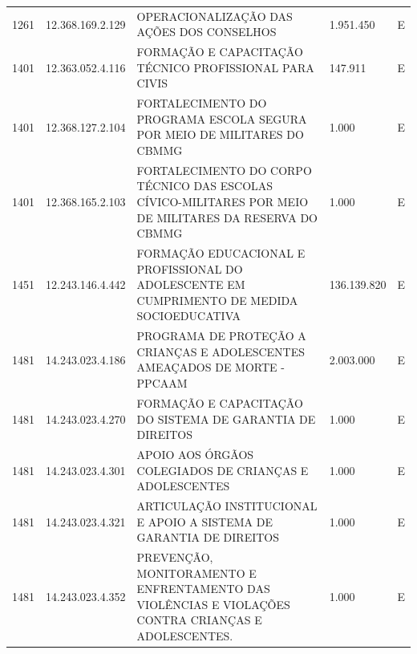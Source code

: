 \documentclass{article}
\begin{document}
\begin{longtable}[c]{m{1cm}|m{2cm}|m{10cm}|m{2cm}|m{1cm}}
\multicolumn{1}{C{1cm}|}{1261} & \multicolumn{1}{C{2cm}|}{12.368.169.2.129} & \multicolumn{1}{L{10cm}|}{OPERACIONALIZAÇÃO DAS AÇÕES DOS CONSELHOS} & \multicolumn{1}{R{2cm}|}{1.951.450} & \multicolumn{1}{C{1cm}}{E} \\
\multicolumn{1}{C{1cm}|}{1401} & \multicolumn{1}{C{2cm}|}{12.363.052.4.116} & \multicolumn{1}{L{10cm}|}{FORMAÇÃO E CAPACITAÇÃO TÉCNICO PROFISSIONAL PARA CIVIS} & \multicolumn{1}{R{2cm}|}{147.911} & \multicolumn{1}{C{1cm}}{E} \\
\multicolumn{1}{C{1cm}|}{1401} & \multicolumn{1}{C{2cm}|}{12.368.127.2.104} & \multicolumn{1}{L{10cm}|}{FORTALECIMENTO DO PROGRAMA ESCOLA SEGURA POR MEIO DE MILITARES DO CBMMG} & \multicolumn{1}{R{2cm}|}{1.000} & \multicolumn{1}{C{1cm}}{E} \\
\multicolumn{1}{C{1cm}|}{1401} & \multicolumn{1}{C{2cm}|}{12.368.165.2.103} & \multicolumn{1}{L{10cm}|}{FORTALECIMENTO DO CORPO TÉCNICO DAS ESCOLAS CÍVICO-MILITARES POR MEIO DE MILITARES DA RESERVA DO CBMMG} & \multicolumn{1}{R{2cm}|}{1.000} & \multicolumn{1}{C{1cm}}{E} \\
\multicolumn{1}{C{1cm}|}{1451} & \multicolumn{1}{C{2cm}|}{12.243.146.4.442} & \multicolumn{1}{L{10cm}|}{FORMAÇÃO EDUCACIONAL E PROFISSIONAL DO ADOLESCENTE EM CUMPRIMENTO DE MEDIDA SOCIOEDUCATIVA} & \multicolumn{1}{R{2cm}|}{136.139.820} & \multicolumn{1}{C{1cm}}{E} \\
\multicolumn{1}{C{1cm}|}{1481} & \multicolumn{1}{C{2cm}|}{14.243.023.4.186} & \multicolumn{1}{L{10cm}|}{PROGRAMA DE PROTEÇÃO A CRIANÇAS E ADOLESCENTES AMEAÇADOS DE MORTE - PPCAAM} & \multicolumn{1}{R{2cm}|}{2.003.000} & \multicolumn{1}{C{1cm}}{E} \\
\multicolumn{1}{C{1cm}|}{1481} & \multicolumn{1}{C{2cm}|}{14.243.023.4.270} & \multicolumn{1}{L{10cm}|}{FORMAÇÃO E CAPACITAÇÃO DO SISTEMA DE GARANTIA DE DIREITOS} & \multicolumn{1}{R{2cm}|}{1.000} & \multicolumn{1}{C{1cm}}{E} \\
\multicolumn{1}{C{1cm}|}{1481} & \multicolumn{1}{C{2cm}|}{14.243.023.4.301} & \multicolumn{1}{L{10cm}|}{APOIO AOS ÓRGÃOS COLEGIADOS DE CRIANÇAS E ADOLESCENTES} & \multicolumn{1}{R{2cm}|}{1.000} & \multicolumn{1}{C{1cm}}{E} \\
\multicolumn{1}{C{1cm}|}{1481} & \multicolumn{1}{C{2cm}|}{14.243.023.4.321} & \multicolumn{1}{L{10cm}|}{ARTICULAÇÃO INSTITUCIONAL E APOIO A SISTEMA DE GARANTIA DE DIREITOS} & \multicolumn{1}{R{2cm}|}{1.000} & \multicolumn{1}{C{1cm}}{E} \\
\multicolumn{1}{C{1cm}|}{1481} & \multicolumn{1}{C{2cm}|}{14.243.023.4.352} & \multicolumn{1}{L{10cm}|}{PREVENÇÃO, MONITORAMENTO E ENFRENTAMENTO DAS VIOLÊNCIAS E VIOLAÇÕES CONTRA CRIANÇAS E ADOLESCENTES.} & \multicolumn{1}{R{2cm}|}{1.000} & \multicolumn{1}{C{1cm}}{E} \\

\end{longtable}
\end{document}

